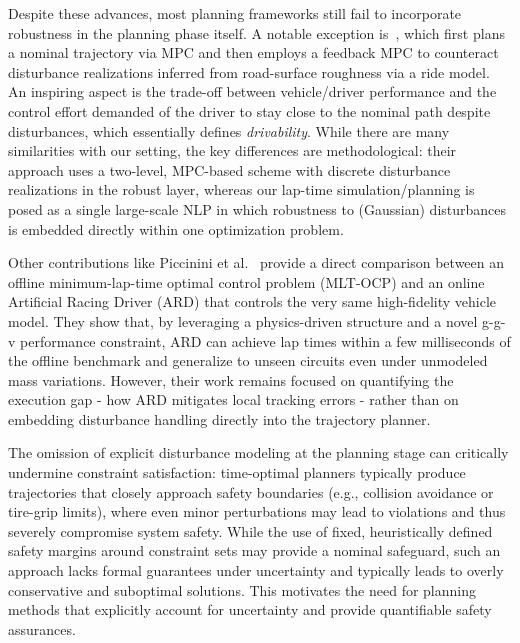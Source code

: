 Despite these advances, most planning frameworks still fail to incorporate robustness in the planning phase itself. A notable exception is~\cite{Timings:RobustLaptimeSimulation:2014a}, which first plans a nominal trajectory via MPC and then employs a feedback MPC to counteract disturbance realizations inferred from road-surface roughness via a ride model. An inspiring aspect is the trade-off between vehicle/driver performance and the control effort demanded of the driver to stay close to the nominal path despite disturbances, which essentially defines \emph{drivability}. While there are many similarities with our setting, the key differences are methodological: their approach uses a two-level, MPC-based scheme with discrete disturbance realizations in the robust layer, whereas our lap-time simulation/planning is posed as a single large-scale NLP in which robustness to (Gaussian) disturbances is embedded directly within one optimization problem.

Other contributions like Piccinini et al.~\cite{Piccinini:HowOptimalMinimumtime:2024} provide a direct comparison between an offline minimum-lap-time optimal control problem (MLT-OCP) and an online Artificial Racing Driver (ARD) that controls the very same high-fidelity vehicle model. They show that, by leveraging a physics-driven structure and a novel g-g-v performance constraint, ARD can achieve lap times within a few milliseconds of the offline benchmark and generalize to unseen circuits even under unmodeled mass variations. However, their work remains focused on quantifying the execution gap - how ARD mitigates local tracking errors - rather than on embedding disturbance handling directly into the trajectory planner.

The omission of explicit disturbance modeling at the planning stage can critically undermine constraint satisfaction: time-optimal planners typically produce trajectories that closely approach safety boundaries (e.g., collision avoidance or tire-grip limits), where even minor perturbations may lead to violations and thus severely compromise system safety.
While the use of fixed, heuristically defined safety margins around constraint sets may provide a nominal safeguard, such an approach lacks formal guarantees under uncertainty and typically leads to overly conservative and suboptimal solutions. This motivates the need for planning methods that explicitly account for uncertainty and provide quantifiable safety assurances.

